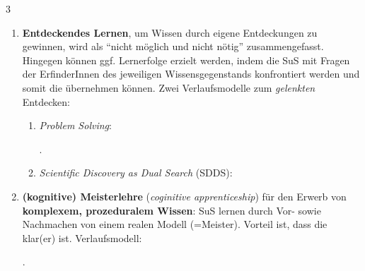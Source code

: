 \begin{landscape}
\begin{multicols*}{3}
\begin{myBox}[title=\enquote{Lehr-Lernprozesse in der Schule: Studium} \cite{maier}]
\begin{enumerate}
\begin{enumerate*}
              \end{enumerate*}
              Hauptmerkmale:  sowie  ggü. anderen Begriffen.
        \item \textbf{Entdeckendes Lernen}, um Wissen durch eigene Entdeckungen zu gewinnen, wird als \enquote{nicht möglich und nicht nötig} zusammengefasst. Hingegen können ggf. Lernerfolge erzielt werden, indem die SuS mit Fragen der ErfinderInnen des jeweiligen Wissensgegenstands konfrontiert werden und somit die  übernehmen können. Zwei Verlaufsmodelle zum \textit{gelenkten} Entdecken:
              \begin{enumerate}
                \item \textit{Problem Solving}: .
                \item \textit{Scientific Discovery as Dual Search} (SDDS):
              \end{enumerate}
        \item \textbf{(kognitive) Meisterlehre} (\textit{coginitive apprenticeship}) für den Erwerb von \textbf{komplexem, prozeduralem Wissen}: SuS lernen durch Vor- sowie Nachmachen von einem realen Modell (=Meister). Vorteil ist, dass die  klar(er) ist. Verlaufsmodell: .
      \end{enumerate}
    \end{myBox}



\end{multicols*}
\end{landscape}
